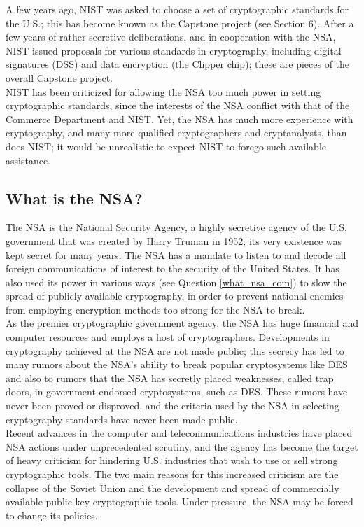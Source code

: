 A few years ago, NIST was asked to choose a set of cryptographic
standards for the U.S.; this has become known as the Capstone project
(see Section 6). After a few years of rather secretive deliberations,
and in cooperation with the NSA, NIST issued proposals for various
standards in cryptography, including digital signatures (DSS) and data
encryption (the Clipper chip); these are pieces of the overall Capstone
project.\\

NIST has been criticized for allowing the NSA too much power in setting
cryptographic standards, since the interests of the NSA conflict with
that of the Commerce Department and NIST. Yet, the NSA has much more
experience with cryptography, and many more qualified cryptographers
and cryptanalysts, than does NIST; it would be unrealistic to expect
NIST to forego such available assistance.

\subsection{What is the NSA?}
\label{what_nsa}

The NSA is the National Security Agency, a highly secretive agency of the
U.S. government that was created by Harry Truman in 1952; its very
existence was kept secret for many years. The NSA has a mandate to listen
to and decode all foreign communications of interest to the security of the
United States. It has also used its power in various ways (see Question
\ref{what_nsa_com}) to slow the spread of publicly available cryptography,
in order to prevent national enemies from employing encryption methods too
strong for the NSA to break.\\

As the premier cryptographic government agency, the NSA has huge
financial and computer resources and employs a host of cryptographers.
Developments in cryptography achieved at the NSA are not made public;
this secrecy has led to many rumors about the NSA's ability to break
popular cryptosystems like DES and also to rumors that the NSA has
secretly placed weaknesses, called trap doors, in government-endorsed
cryptosystems, such as DES. These rumors have never been proved or
disproved, and the criteria used by the NSA in selecting cryptography
standards have never been made public.\\

Recent advances in the computer and telecommunications industries have
placed NSA actions under unprecedented scrutiny, and the agency has
become the target of heavy criticism for hindering U.S. industries that
wish to use or sell strong cryptographic tools. The two main reasons
for this increased criticism are the collapse of the Soviet Union and
the development and spread of commercially available public-key
cryptographic tools. Under pressure, the NSA may be forced to change
its policies.

